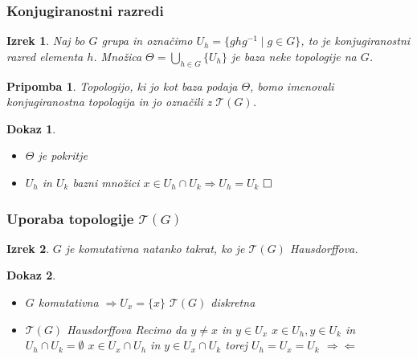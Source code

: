 \documentclass{beamer}
\def\qed{$\hfill\Box$}   %
\newtheorem{izrek}{Izrek}
\newtheorem{pripomba}{Pripomba}
\newtheorem{dokaz}{Dokaz}
\begin{document}
\begin{frame}
\frametitle{Konjugiranostni razredi}

\begin{izrek}
    Naj bo $G$ grupa in označimo $U_h = \{ghg^{-1} \mid g \in G \}$, to je konjugiranostni razred elementa $h$.
    \pause
    Množica $\Theta = \bigcup_{h \in G}\{U_h\}$ je baza neke topologije na $G$.
    \pause
\end{izrek}


\begin{pripomba}
    Topologijo, ki jo kot baza podaja $\Theta$, bomo imenovali \emph{konjugiranostna topologija} in jo označili z $\mathcal{T}(G)$.
    \pause
\end{pripomba}

\begin{dokaz}
    \begin{itemize}
        \item $\Theta$ je pokritje
        \pause
        \item$U_h$ in $U_k$ bazni množici
        \newline
        \pause
        $x \in U_h \cap U_k \Rightarrow U_h = U_k$
        \pause
        \qed
    \end{itemize}
\end{dokaz}

\end{frame}


\begin{frame}
\frametitle{Uporaba topologije $\mathcal{T}(G)$}

\begin{izrek}
    $G$ je komutativna natanko takrat, ko je $\mathcal{T}(G)$ Hausdorffova.
    \pause
\end{izrek}

\begin{dokaz}
    \begin{itemize}
        \item[($\Rightarrow$)] $G$ komutativna $\Rightarrow U_x = \{x\}$
        \newline
        \pause
        $\mathcal{T}(G)$ diskretna
        \bigskip
        \pause
        \item[($\Leftarrow$)] $\mathcal{T}(G)$ Hausdorffova
        \newline
        \pause
        Recimo da $y \neq x$ in $y \in U_x$
        \newline
        \pause
        $x \in U_h, y \in U_k$ in $U_h \cap U_k = \emptyset$
        \newline
        \pause
        $x \in U_x \cap U_h$ in $y \in U_x \cap U_k$ torej $U_h = U_x = U_k$
        \pause
        $\Rightarrow\!\Leftarrow$
    \end{itemize}
\end{dokaz}

\end{frame}
\end{document}
